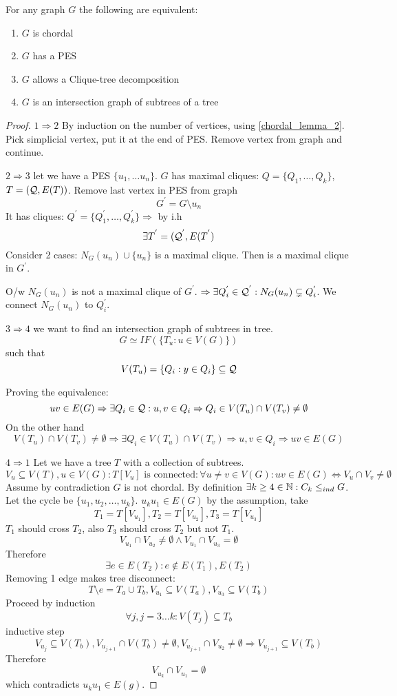 \begin{theorem}
	For any graph $G$ the following are equivalent:
	\begin{enumerate}
		\item $G$ is chordal
		\item $G$ has a PES
		\item $G$ allows a Clique-tree decomposition
		\item $G$ is an intersection graph of subtrees of a tree
	\end{enumerate}
\end{theorem}
\begin{proof}
	$1 \Rightarrow 2$ By induction on the number of vertices, using \cref{chordal_lemma_2}.
	Pick simplicial vertex, put it at the end of PES.
	Remove vertex from graph and continue.

	$2 \Rightarrow 3$ let we have a PES $\{ u_1, \ldots u_n \}$.
	$G$ has maximal cliques: $Q = \{ Q_1, \ldots, Q_k \}$, $T = (\operatorname{\mathcal{Q}}, E(T))$.
	Remove last vertex in PES from graph
	\[ G^{'} = G \setminus u_n \]
	It has cliques: $Q^{'} = \{ Q_1^{'}, \ldots, Q_k^{'} \} \Rightarrow$ by i.h
	\[ \exists T^{'} = (\operatorname{\mathcal{Q}}^{'}, E(T^{'}) \]
	Consider 2 cases: $N_G(u_n) \cup \{ u_n \}$ is a maximal clique.
	Then is a maximal clique in $G^{'}$.

	O/w $N_G(u_n)$ is not a maximal clique of $G^{'}$.
	$\Rightarrow \exists Q_i^{'} \in \operatorname{\mathcal{Q}}^{'}: N_G(u_n) \subsetneq Q_i^{'}$.
	We connect $N_G(u_n)$ to $Q_i^{'}$.

	$3 \Rightarrow 4$ we want to find an intersection graph of subtrees in tree.
	\[ G \simeq IF(\{T_u: u \in V(G) \}) \]
	such that
	\[ V(T_u) = \{ Q_i: y \in Q_i \} \subseteq \operatorname{\mathcal{Q}} \]

	Proving the equivalence:
	\[ uv \in E(G) \Rightarrow \exists Q_i \in \operatorname{\mathcal{Q}}: u,v \in Q_i \Rightarrow Q_i \in V(T_u) \cap V(T_v) \neq \emptyset \]
	On the other hand
	\[ V(T_u) \cap V(T_v) \neq \emptyset \Rightarrow \exists Q_i \in V(T_u) \cap V(T_v) \Rightarrow u, v \in Q_i \Rightarrow uv \in E(G) \]

	$4 \Rightarrow 1$ Let we have a tree $T$ with a collection of subtrees.
	\[V_u \subseteq V(T), u \in V(G): T[V_u] \text{ is connected}: \forall u \ne v \in V(G): uv \in E(G) \iff V_u \cap V_v \ne \emptyset \]
	Assume by contradiction $G$ is not chordal.
	By definition $\exists k \geq 4 \in \operatorname{\mathbb{N}}: C_k \leq_{ind} G$.
	Let the cycle be $\{ u_1, u_2, \ldots, u_k \}$.
	$u_k u_1 \in E(G)$ by the assumption, take
	\[ T_1 = T[V_{u_1}], T_2 = T[V_{u_2}], T_3 = T[V_{u_3}] \]
	$T_1$ should cross $T_2$, also $T_3$ should cross $T_2$ but not $T_1$.
	\[ V_{u_1} \cap V_{u_2} \ne \emptyset \land V_{u_1} \cap V_{u_3} = \emptyset \]
	Therefore
	\[ \exists e \in E(T_2): e \notin E(T_1), E(T_2) \]
	Removing 1 edge makes tree disconnect:
	\[ T \setminus e = T_a \cup T_b, V_{u_1} \subseteq V(T_a), V_{u_3} \subseteq V(T_b) \]
	Proceed by induction
	\[ \forall j, j = 3 \ldots k: V(T_j) \subseteq T_b \]
	inductive step
	\[ V_{u_j} \subseteq V(T_b), V_{u_{j + 1}} \cap V(T_b) \neq \emptyset, V_{u_{j + 1}} \cap V_{u_2} \ne \emptyset \Rightarrow V_{u_{j + 1}} \subseteq V(T_b)\]
	Therefore
	\[ V_{u_k} \cap V_{u_1} = \emptyset \]
	which contradicts $u_k u_1 \in E(g)$.


\end{proof}
